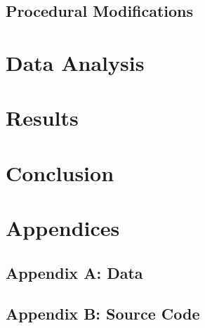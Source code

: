 \documentclass[a4paper]{article}
\begin{document}
\subsection{Procedural Modifications}

\qq 

\section{Data Analysis}
\qq

\section{Results}
\qq

\section{Conclusion}
\qq 

\section{Appendices}

\subsection{Appendix A: Data}

\subsection{Appendix B: Source Code}
\end{document}
